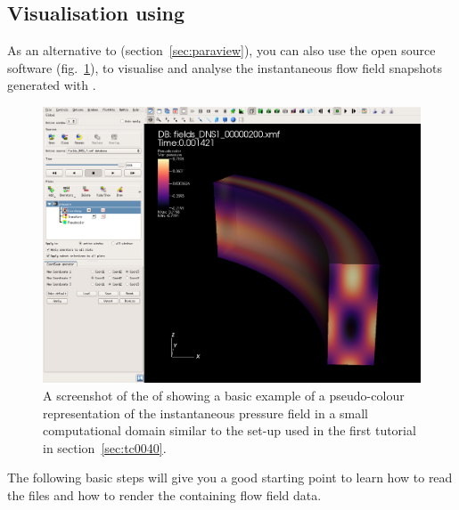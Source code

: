 \documentclass[a4paper, 11pt, DIV=11]{scrartcl}
\begin{document}
\subsection{Visualisation using \visit}
\label{sec:visit}
As an alternative to \paraview (section~\ref{sec:paraview}), you can also use
the open source software \visit (fig.~\ref{fig:VisIt}), to visualise and
analyse the instantaneous flow field snapshots generated with \nsc.
\begin{figure}[htb]
\includegraphics[width=1.00\linewidth]{figures/visit.png}
\caption{A screenshot of the  of \visit showing a basic example
of a pseudo-colour representation of the instantaneous pressure field in
a small computational domain similar to the set-up used in the first
tutorial in section~\ref{sec:tc0040}.}
\label{fig:VisIt}
\end{figure}
The following basic steps will give you a good starting point to learn
how to read the \hdf files and how to render the containing flow field
data.
\end{document}
